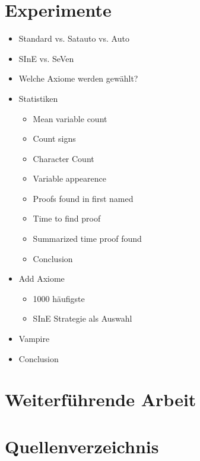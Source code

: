 \documentclass[german,version-2020-11]{uzl-thesis}
\begin{document}
\chapter{Experimente}
\begin{itemize}
  \item Standard vs. Satauto vs. Auto
  \item SInE vs. SeVen 
  \item Welche Axiome werden gewählt?
  \item Statistiken
  \begin{itemize}
    \item Mean variable count
    \item Count signs
    \item Character Count
    \item Variable appearence
    \item Proofs found in first named
    \item Time to find proof
    \item Summarized time proof found
    \item Conclusion
  \end{itemize}
  \item Add Axiome
  \begin{itemize}
    \item 1000 häufigste
    \item SInE Strategie als Auswahl
  \end{itemize}
  \item Vampire
  \item Conclusion
\end{itemize}
\chapter{Weiterführende Arbeit}
\chapter{Quellenverzeichnis}
\end{document}
